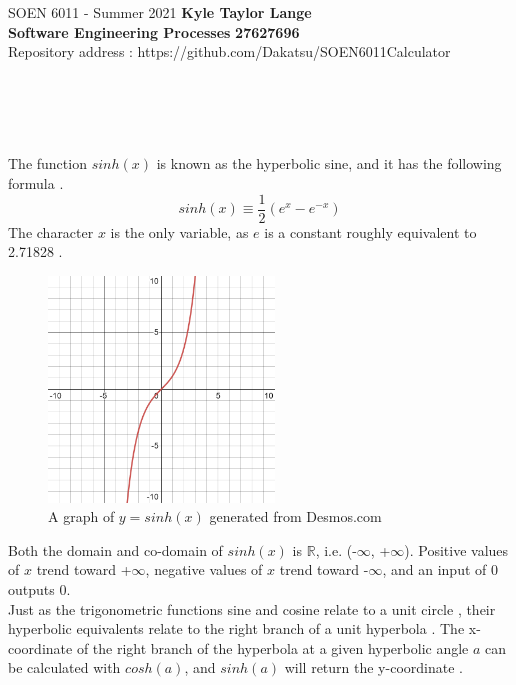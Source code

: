 \documentclass[letterpaper, 11pt]{report}
\begin{document}
\section*{}
\normalsize {SOEN 6011 - Summer 2021} \hfill \textbf{Kyle Taylor Lange} \\
\textbf{ Software Engineering Processes}  \hfill \textbf{27627696} \\
\hfill Repository address : https://github.com/Dakatsu/SOEN6011Calculator
\\\\\\\\\\
\normalsize{The function $sinh(x)$ is known as the hyperbolic sine, and it has the following formula \cite{sinh}. 
$$sinh(x) \equiv \frac{1}{2}(e^x-e^{-x})$$
The character $x$ is the only variable, as $e$ is a constant roughly equivalent to 2.71828 \cite{e}.

 \begin{figure}[SOEN_6011-Problem-1/images/desmos-graph-f3.png]
 \centering
 \includegraphics[width= 6cm]{SOEN_6011-Problem-1/images/desmos-graph-f3.png}
  \caption{A graph of $y = sinh(x)$ generated from Desmos.com}
\end{figure}

Both the domain and co-domain of $sinh(x)$ is $\mathbb{R}$, i.e. (-$\infty$, +$\infty$). Positive values of $x$ trend toward +$\infty$, negative values of $x$ trend toward -$\infty$, and an input of 0 outputs 0.
\\Just as the trigonometric functions sine and cosine relate to a unit circle \cite{circular}, their hyperbolic equivalents relate to the right branch of a unit hyperbola \cite{hyperbolic}. The x-coordinate of the right branch of the hyperbola at a given hyperbolic angle $a$ can be calculated with $cosh(a)$, and $sinh(a)$ will return the y-coordinate \cite{rectHyperbola}.}
\end{document}
